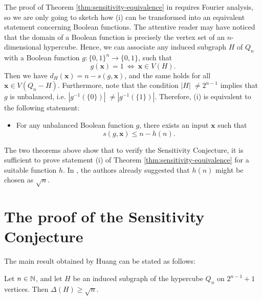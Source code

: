 The proof of Theorem \ref{thm:sensitivity-equivalence} in \cite{gotsmanlinial} requires Fourier analysis, so we are only going to sketch how (i) can be transformed into an equivalent statement concerning Boolean functions.
The attentive reader may have noticed that the domain of a Boolean function is precisely the vertex set of an $n$-dimensional hypercube. 
Hence, we can associate any induced subgraph $H$ of $Q_n$ with a Boolean function $g: \{0, 1\}^n \rightarrow \{ 0 , 1\}$, such that
\begin{equation*}
    g(\bm{x}) = 1 \ \Longleftrightarrow \ \bm{x} \in V(H).
\end{equation*}
Then we have $d_H(\bm{x}) = n - s(g, \bm{x})$, and the same holds for all $\bm{x} \in V(Q_n - H)$.
Furthermore, note that the condition $|H| \; \ne 2^{n - 1}$ implies that $g$ is unbalanced, i.e. $|g^{-1} (\{0\})|\; \ne |g^{-1} (\{1\})|$.
Therefore, (i) is equivalent to the following statement: 

\begingroup
    \itshape
    \begin{itemize}[font=\upshape]
        \item[(i')] For any unbalanced Boolean function $g$, there exists an input $\bm{x}$ such that 
            \begin{equation*}
                s(g, \bm{x}) \le n - h(n).
            \end{equation*}
    \end{itemize}
\endgroup

The two theorems above show that to verify the Sensitivity Conjecture, it is sufficient to prove statement (i) of Theorem \ref{thm:sensitivity-equivalence} for a suitable function $h$.
In \cite{gotsmanlinial}, the authors already suggested that $h(n)$ might be chosen as $\sqrt{n}$.

\section{The proof of the Sensitivity Conjecture}
    \label{section:sensitivity}

The main result obtained by Huang can be stated as follows:

\begin{theorem} \label{thm:induced-subgraphs}
    Let $n \in \mathbb{N}$, and let $H$ be an induced subgraph of the hypercube $Q_n$ on $2^{n - 1} + 1$ vertices. 
    Then $\Delta(H) \ge \sqrt{n}$. 
\end{theorem}

